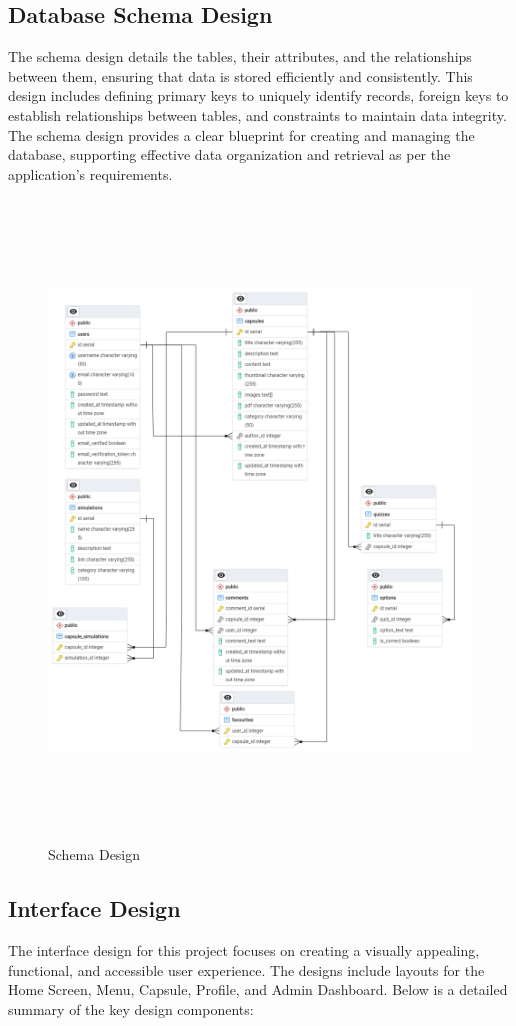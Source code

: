 \subsection{Database Schema Design}
The schema design details the tables, their attributes, and the relationships between them, ensuring that data is stored efficiently and consistently. This design includes defining primary keys to uniquely identify records, foreign keys to establish relationships between tables, and constraints to maintain data integrity. The schema design provides a clear blueprint for creating and managing the database, supporting effective data organization and retrieval as per the application’s requirements.
\begin{figure}[H]
   \centering
    \includegraphics[height = 17cm]{Diagrams/Schema Design.png}
    \caption{Schema Design}
\end{figure}
\newpage

\subsection{Interface Design}
The interface design for this project focuses on creating a visually appealing, functional, and accessible user experience. The designs include layouts for the Home Screen, Menu, Capsule, Profile, and Admin Dashboard. Below is a detailed summary of the key design components:

